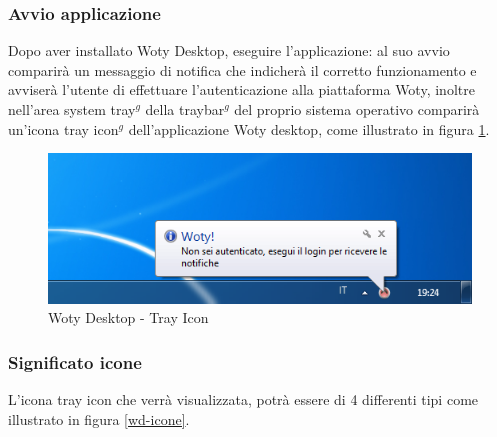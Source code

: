 \subsubsection{Avvio applicazione}
Dopo aver installato Woty Desktop, eseguire l'applicazione:
al suo avvio comparirà un messaggio di notifica che indicherà il corretto funzionamento e avviserà l'utente di effettuare l'autenticazione alla piattaforma Woty, inoltre nell'area system tray$^g$ della traybar$^g$ del proprio sistema operativo comparirà un'icona tray icon$^g$  dell'applicazione Woty desktop, come illustrato in figura \ref{wd-trayicon}.

\begin{center}
\begin{figure}[ht]
\centering
\includegraphics[scale=0.6]{images/wotyDesktop/schreenshots/msg-start.png}
\caption{Woty Desktop - Tray Icon}
\label{wd-trayicon}
\end{figure}
\end{center}


	\subsubsection{Significato icone}
L'icona tray icon che verrà visualizzata, potrà essere di 4 differenti tipi come illustrato in figura \ref{wd-icone}.

